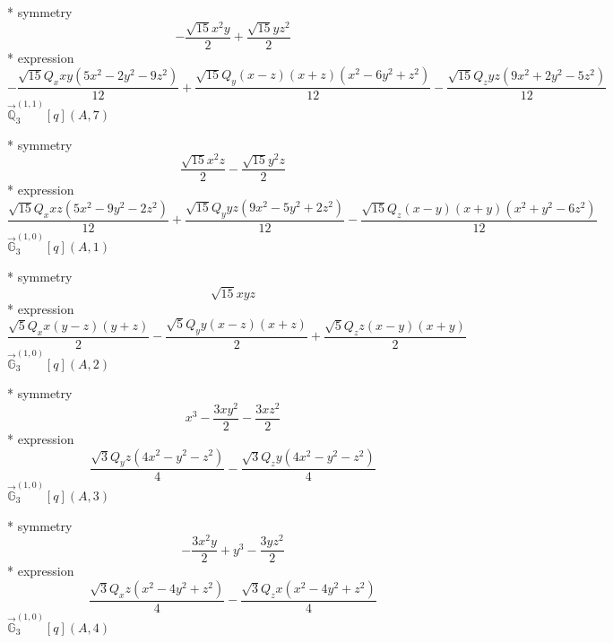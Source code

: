 \documentclass[fleqn,8pt]{jsarticle}
\begin{document}
\noindent\quad ** symmetry
\begin{dmath*}
- \frac{\sqrt{15} x^{2} y}{2} + \frac{\sqrt{15} y z^{2}}{2}
\end{dmath*}
\noindent\quad ** expression
\begin{dmath*}
- \frac{\sqrt{15} Q_{x} x y \left(5 x^{2} - 2 y^{2} - 9 z^{2}\right)}{12} + \frac{\sqrt{15} Q_{y} \left(x - z\right) \left(x + z\right) \left(x^{2} - 6 y^{2} + z^{2}\right)}{12} - \frac{\sqrt{15} Q_{z} y z \left(9 x^{2} + 2 y^{2} - 5 z^{2}\right)}{12}
\end{dmath*}
\noindent\quad $\vec{\mathbb{Q}}_{3}^{(1,1)}[q](A,7)$

\noindent\quad ** symmetry
\begin{dmath*}
\frac{\sqrt{15} x^{2} z}{2} - \frac{\sqrt{15} y^{2} z}{2}
\end{dmath*}
\noindent\quad ** expression
\begin{dmath*}
\frac{\sqrt{15} Q_{x} x z \left(5 x^{2} - 9 y^{2} - 2 z^{2}\right)}{12} + \frac{\sqrt{15} Q_{y} y z \left(9 x^{2} - 5 y^{2} + 2 z^{2}\right)}{12} - \frac{\sqrt{15} Q_{z} \left(x - y\right) \left(x + y\right) \left(x^{2} + y^{2} - 6 z^{2}\right)}{12}
\end{dmath*}
\noindent\quad $\vec{\mathbb{G}}_{3}^{(1,0)}[q](A,1)$

\noindent\quad ** symmetry
\begin{dmath*}
\sqrt{15} x y z
\end{dmath*}
\noindent\quad ** expression
\begin{dmath*}
\frac{\sqrt{5} Q_{x} x \left(y - z\right) \left(y + z\right)}{2} - \frac{\sqrt{5} Q_{y} y \left(x - z\right) \left(x + z\right)}{2} + \frac{\sqrt{5} Q_{z} z \left(x - y\right) \left(x + y\right)}{2}
\end{dmath*}
\noindent\quad $\vec{\mathbb{G}}_{3}^{(1,0)}[q](A,2)$

\noindent\quad ** symmetry
\begin{dmath*}
x^{3} - \frac{3 x y^{2}}{2} - \frac{3 x z^{2}}{2}
\end{dmath*}
\noindent\quad ** expression
\begin{dmath*}
\frac{\sqrt{3} Q_{y} z \left(4 x^{2} - y^{2} - z^{2}\right)}{4} - \frac{\sqrt{3} Q_{z} y \left(4 x^{2} - y^{2} - z^{2}\right)}{4}
\end{dmath*}
\noindent\quad $\vec{\mathbb{G}}_{3}^{(1,0)}[q](A,3)$

\noindent\quad ** symmetry
\begin{dmath*}
- \frac{3 x^{2} y}{2} + y^{3} - \frac{3 y z^{2}}{2}
\end{dmath*}
\noindent\quad ** expression
\begin{dmath*}
\frac{\sqrt{3} Q_{x} z \left(x^{2} - 4 y^{2} + z^{2}\right)}{4} - \frac{\sqrt{3} Q_{z} x \left(x^{2} - 4 y^{2} + z^{2}\right)}{4}
\end{dmath*}
\noindent\quad $\vec{\mathbb{G}}_{3}^{(1,0)}[q](A,4)$
\end{document}
